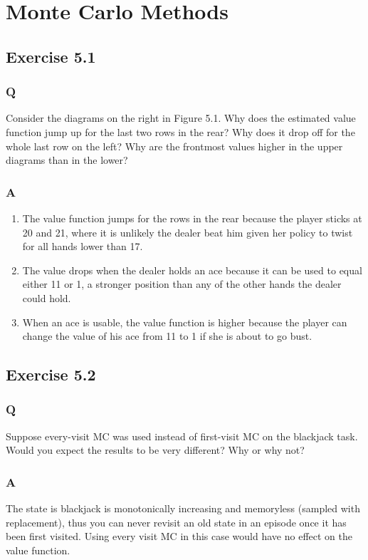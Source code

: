 \section{Monte Carlo Methods}

\subsection*{Exercise 5.1}
\subsubsection{Q}
Consider the diagrams on the right in Figure 5.1. Why does the estimated value function jump up for the last two rows in the rear? Why does it drop off for the whole last row on the left? Why are the frontmost values higher in the upper diagrams than in the lower?
\subsubsection{A}
\begin{enumerate}
	\item The value function jumps for the rows in the rear because the player sticks at 20 and 21, where it is unlikely the dealer beat him given her policy to twist for all hands lower than 17.
	\item The value drops when the dealer holds an ace because it can be used to equal either 11 or 1, a stronger position than any of the other hands the dealer could hold.
	\item When an ace is usable, the value function is higher because the player can change the value of his ace from 11 to 1 if she is about to go bust.
\end{enumerate}

\subsection*{Exercise 5.2}
\subsubsection{Q}
Suppose every-visit MC was used instead of first-visit MC on the blackjack task. Would you expect the results to be very different? Why or why not?
\subsubsection{A}
The state is blackjack is monotonically increasing and memoryless (sampled with replacement), thus you can never revisit an old state in an episode once it has been first visited. Using every visit MC in this case would have no effect on the value function.

